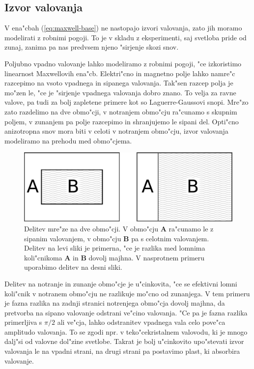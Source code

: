 \documentclass[a4paper,10pt]{article}
\begin{document}
\subsection{Izvor valovanja}

V ena"cbah (\ref{eq:maxwell-base}) ne nastopajo izvori valovanja, zato jih moramo modelirati z robnimi pogoji. 
To je v skladu z eksperimenti, saj svetloba pride od zunaj, zanima pa nas predvsem njeno "sirjenje skozi snov. 

Poljubno vpadno valovanje lahko modeliramo z robnimi pogoji, "ce izkoristimo linearnost Maxwellovih ena"cb. 
Elektri"cno in magnetno polje lahko namre"c razcepimo na vsoto vpadnega in sipanega valovanja\cite{taflove}. 
Tak"sen razcep polja je mo"zen le, "ce je "sirjenje vpadnega valovanja dobro znano. 
To velja za ravne valove, pa tudi za bolj zapletene primere kot so Laguerre-Gaussovi snopi. 
Mre"zo zato razdelimo na dve obmo"cji, v notranjem obmo"cju ra"cunamo s skupnim poljem, v zunanjem pa polje razcepimo in shranjujemo le sipani del.
Opti"cno anizotropna snov mora biti v celoti v notranjem obmo"cju, izvor valovanja modeliramo na prehodu med obmo"cjema. 

\begin{figure}[h]
 \centering
 \includegraphics[width=.8\textwidth]{./Slike/wave-source-regions}
 \caption{Delitev mre"ze na dve obmo"cji. V obmo"cju \textbf{A} ra"cunamo le z sipanim valovanjem, v obmo"cju \textbf{B} pa s celotnim valovanjem. Delitev na levi sliki je primerna, "ce je razlika med lomnima koli"cnikoma \textbf{A} in \textbf{B} dovolj majhna. V nasprotnem primeru uporabimo delitev na desni sliki. }
 \label{fig:wave-source-regions}
\end{figure}

Delitev na notranje in zunanje obmo"cje je u"cinkovita, "ce se efektivni lomni koli"cnik v notranem obmo"cju ne razlikuje mo"cno od zunanjega. 
V tem primeru je fazna razlika na zadnji stranici notrenjega obmo"cja dovolj majhna, da pretvorba na sipano valovanje odstrani ve"cino valovanja. 
"Ce pa je fazna razlika primerljiva s $\pi/2$ ali ve"cja, lahko odstranitev vpadnega vala celo pove"ca amplitudo valovanja. 
To se zgodi npr. v teko"cekristalnem valovodu, ki je mnogo dalj"si od valovne dol"zine svetlobe. 
Takrat je bolj u"cinkovito upo"stevati izvor valovanja le na vpadni strani, na drugi strani pa postavimo plast, ki absorbira valovanje. 
\end{document}
